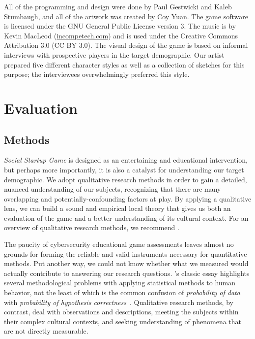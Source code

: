 \documentclass[letterpaper]{article}
\begin{document}
All of the programming and design were done by Paul Gestwicki and
Kaleb Stumbaugh, and all of the artwork was created by Coy Yuan.  
The game software is licensed under the GNU General Public License
version 3.
The music is by Kevin MacLeod (\url{incompetech.com}) and is used under the
Creative Commons Attribution 3.0 (CC BY 3.0).
%
The visual design of the game is based on informal interviews with
prospective players in the target demographic. Our artist prepared
five different character styles as well as a collection of sketches
for this purpose; the interviewees overwhelmingly preferred this
style.


\section{Evaluation}
\label{sec:evaluation}

\subsection{Methods}

\textit{Social Startup Game} is designed as an entertaining and educational
intervention, but perhaps more importantly, it is also a catalyst
for understanding our target demographic.
We adopt qualitative research methods in order to gain a detailed,
nuanced understanding of our subjects, recognizing that there are
many overlapping and potentially-confounding factors at play.
By applying a qualitative lens, we can build a sound and empirical local
theory that gives us both an evaluation of the game and a better understanding
of its cultural context. For an overview of qualitative research methods,
we recommend \citet{Stake2010}.

The
paucity of cybersecurity educational game assessments leaves almost no
grounds for forming the reliable and valid instruments necessary for
quantitative methods.
 Put another way, we could not know whether what
we measured would actually contribute to answering our research
questions.  \citeauthor{Cohen1994}'s classic essay highlights several
methodological problems with applying statistical methods to human
behavior, not the least of which is the common confusion of
\textit{probability of data} with \textit{probability of hypothesis
  correctness}~\citep{Cohen1994}.
Qualitative research methods, by contrast, deal with 
observations and descriptions, meeting the subjects within their
complex cultural contexts, and seeking understanding of phenomena
that are not directly measurable. 
\end{document}
